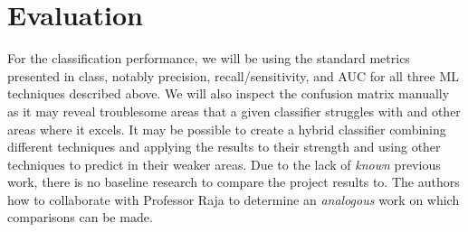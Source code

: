 \documentclass[12pt]{diazessay}
\begin{document}
\section*{Evaluation}

For the classification performance, we will be using the standard metrics presented in class, notably precision, recall/sensitivity, and AUC for all three ML techniques described above.
We will also inspect the confusion matrix manually as it may reveal troublesome areas that a given classifier struggles with and other areas where it excels.
It may be possible to create a hybrid classifier combining different techniques and applying the results to their strength and using other techniques to predict in their weaker areas.
Due to the lack of \emph{known} previous work, there is no baseline research to compare the project results to.
The authors how to collaborate with Professor Raja to determine an \emph{analogous} work on which comparisons can be made.

\clearpage



\end{document}
